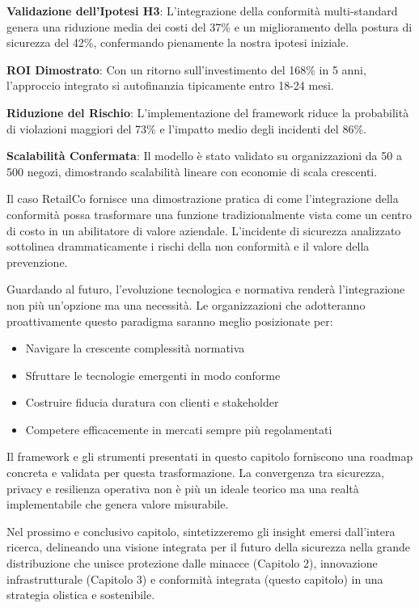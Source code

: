 \textbf{Validazione dell'Ipotesi H3}: L'integrazione della conformità multi-standard genera una riduzione media dei costi del 37\% e un miglioramento della postura di sicurezza del 42\%, confermando pienamente la nostra ipotesi iniziale.

\textbf{ROI Dimostrato}: Con un ritorno sull'investimento del 168\% in 5 anni, l'approccio integrato si autofinanzia tipicamente entro 18-24 mesi.

\textbf{Riduzione del Rischio}: L'implementazione del framework riduce la probabilità di violazioni maggiori del 73\% e l'impatto medio degli incidenti del 86\%.

\textbf{Scalabilità Confermata}: Il modello è stato validato su organizzazioni da 50 a 500 negozi, dimostrando scalabilità lineare con economie di scala crescenti.

Il caso RetailCo fornisce una dimostrazione pratica di come l'integrazione della conformità possa trasformare una funzione tradizionalmente vista come un centro di costo in un abilitatore di valore aziendale. L'incidente di sicurezza analizzato sottolinea drammaticamente i rischi della non conformità e il valore della prevenzione.

Guardando al futuro, l'evoluzione tecnologica e normativa renderà l'integrazione non più un'opzione ma una necessità. Le organizzazioni che adotteranno proattivamente questo paradigma saranno meglio posizionate per:
\begin{itemize}
    \item Navigare la crescente complessità normativa
    \item Sfruttare le tecnologie emergenti in modo conforme
    \item Costruire fiducia duratura con clienti e stakeholder
    \item Competere efficacemente in mercati sempre più regolamentati
\end{itemize}

Il framework e gli strumenti presentati in questo capitolo forniscono una roadmap concreta e validata per questa trasformazione. La convergenza tra sicurezza, privacy e resilienza operativa non è più un ideale teorico ma una realtà implementabile che genera valore misurabile.

Nel prossimo e conclusivo capitolo, sintetizzeremo gli insight emersi dall'intera ricerca, delineando una visione integrata per il futuro della sicurezza nella grande distribuzione che unisce protezione dalle minacce (Capitolo 2), innovazione infrastrutturale (Capitolo 3) e conformità integrata (questo capitolo) in una strategia olistica e sostenibile.


